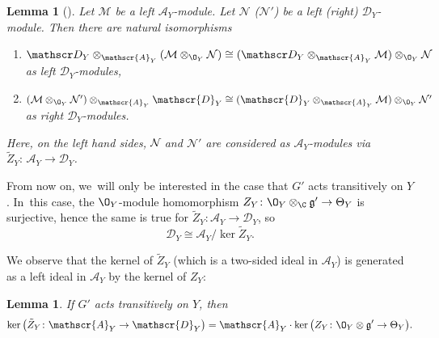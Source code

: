 \documentclass[JEP,XML,SOM,Unicode,published]{cedram}
\let\ra\rightarrow
\newtheorem{lem}[thm]{Lemma}
\newcommand{\cA}{\mathscr{A}}
\newcommand{\frg}{\mathfrak{g}}
\begin{document}
\begin{lem}[{\cite[Th.\,A.6 \& Cor.\,A.2]{CN05}}] \label{lem:tensorProductsOnAandD}
Let $\mathcal M$ be a left $\cA_Y$\nobreakdash-mod\-ule. Let $\mathcal N$ (\resp $\mathcal N'$) be a left (\resp right) $\mathscr{D}_Y$\nobreakdash-mod\-ule. Then there are natural isomorphisms
\begin{enumerate}
\item $\mathscr D_Y \otimes_{\cA_Y} (\mathcal M \otimes_{\O_Y} \mathcal N) \cong (\mathscr D_Y \otimes_{\cA_Y} \mathcal M) \otimes_{\O_Y} \mathcal N$ as left $\mathscr{D}_Y$\nobreakdash-mod\-ules, \label{item:leftCNMN}
\item $(\mathcal M \otimes_{\O_Y} \mathcal N') \otimes_{\cA_Y} \mathscr{D}_Y \cong (\mathscr{D}_Y \otimes_{\cA_Y} \mathcal M) \otimes_{\O_Y} \mathcal N'$ as right $\mathscr D_Y$\nobreakdash-mod\-ules. \label{item:rightCNMN}
\end{enumerate}
Here, on the left hand sides, $\mathcal N\mkern-3mu$ and $\mathcal N'$ are considered as $\cA_Y$\nobreakdash-mod\-ules via~\hbox{$\tilde Z_Y{:}\, \cA_Y\!\to\! \mathscr D_Y$}.
\end{lem}

From now on, we~will only be interested in the case that $G'$ acts transitively on $Y$. In~this case, the $\O_Y$\nobreakdash-mod\-ule homomorphism $Z_Y \colon \O_Y \otimes_\C \frg' \to \Theta_Y$ is surjective, hence the same is true for $\tilde{Z}_Y \colon \cA_Y \to \mathscr D_Y$, so
\[
\mathscr{D}_Y \cong \cA_Y/\ker \tilde Z_Y.
\]

We observe that the kernel of $\tilde Z_Y$ (which is a two-sided ideal in $\cA_Y$) is generated as a left ideal in $\cA_Y$ by the kernel of $Z_Y$:

\begin{lem}
\label{lem:kernelGeneratedByVFs}
If $G'$ acts transitively on $Y$, then
\[
\ker\big(\tilde{Z}_Y \colon \cA_Y \ra \mathscr{D}_Y\big) = \cA_Y \cdot \ker\big(Z_Y \colon \O_Y \otimes \frg' \ra \Theta_Y\big).
\]
\end{lem}
\end{document}
